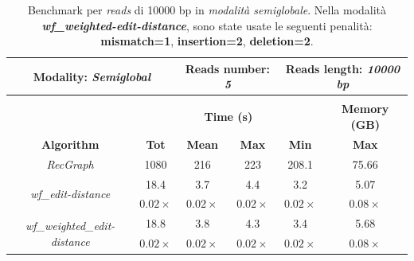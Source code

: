     \begin{table}[h]
        \centering
        \begin{tabular}{|c|c|c|c|c|c|}
            \hline
                \multicolumn{2}{|c|}{\textbf{Modality:} \emph{Semiglobal}} & \multicolumn{2}{|c|}{\textbf{Reads number: } \emph{5}} & \multicolumn{2}{|c|}{\textbf{Reads length:} \emph{10000 bp}} \\
            \hline
                \multicolumn{6}{|c|}{} \\
            \hline
                & \multicolumn{4}{|c|}{\textbf{Time (s)}} & \textbf{Memory (GB)} \\
            \hline
                \textbf{Algorithm} & \textbf{Tot} & \textbf{Mean} & \textbf{Max} & \textbf{Min} & \textbf{Max} \\
            \hline
                \emph{RecGraph} & 1080 & 216 & 223 & 208.1 & 75.66 \\
            \hline
                \multirow{2}{*}{\emph{wf\_edit-distance}} & 18.4 & 3.7 & 4.4 & 3.2 & 5.07 \\
                & $0.02 \times$ & $0.02  \times$ & $0.02 \times$ & $0.02 \times$ & $0.08 \times$ \\
            \hline
                \multirow{2}{*}{\emph{wf\_weighted\_edit-distance}} & 18.8 & 3.8 & 4.3 & 3.4 & 5.68 \\
                & $0.02 \times$ & $0.02 \times$ & $0.02 \times$ & $0.02 \times$ & $0.08 \times$ \\
            \hline
        \end{tabular}
        \caption{Benchmark per \emph{reads} di 10000 bp in \emph{modalità semiglobale}. Nella modalità \textbf{\textit{wf\_weighted-edit-distance}}, sono state usate le seguenti penalità: \textbf{mismatch=1}, \textbf{insertion=2}, \textbf{deletion=2}.}
        \label{tab:benchmark_semiglobal_10k}
    \end{table}
    \vspace{20pt}
    
